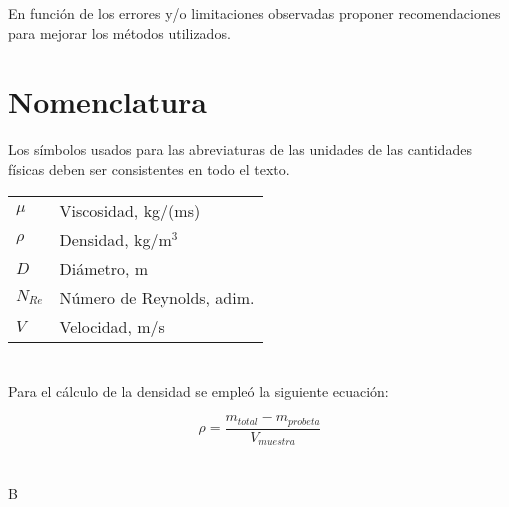 \documentclass{replab}
\begin{document}
En función de los errores y/o limitaciones observadas proponer recomendaciones para mejorar los métodos utilizados.

\section*{Nomenclatura}

Los símbolos usados para las abreviaturas de las unidades de las cantidades físicas deben ser consistentes en todo el texto.

\vspace{1em}

\begin{tabular}{ll}
  $\mu$      & Viscosidad, kg/(ms) \\
  $\rho$     & Densidad, kg/m$^3$ \\
  $D$        & Diámetro, m \\
  $N_{Re}$   & Número de Reynolds, adim. \\
  $V$        & Velocidad, m/s \\
\end{tabular}

\printbibliography[heading=bibintoc]

{
\appendix
\section{}

Para el cálculo de la densidad se empleó la siguiente ecuación:

\begin{equation}
    \rho = \frac{m_{total} - m_{probeta}}{V_{muestra}}
\end{equation}

\section{}

B

}
\end{document}
